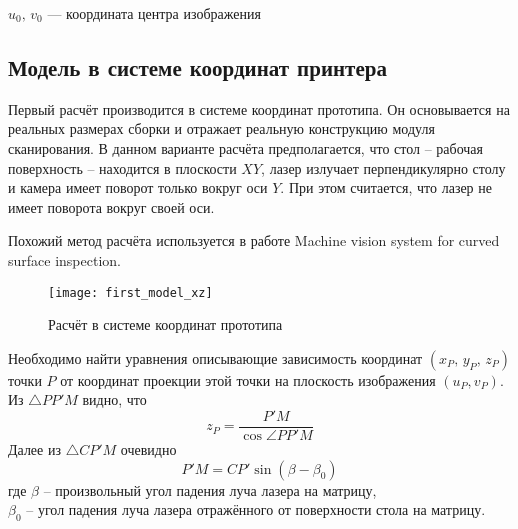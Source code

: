             $ u_0,\,v_0 $ --- координата центра изображения
            
        \subsection{Модель в системе координат принтера}
            Первый расчёт производится в системе координат прототипа. Он основывается на реальных размерах сборки и отражает реальную конструкцию модуля сканирования. В данном варианте расчёта предполагается, что стол -- рабочая поверхность -- находится в плоскости $ XY $, лазер излучает перпендикулярно столу и камера имеет поворот только вокруг оси $ Y $. При этом считается, что лазер не имеет поворота вокруг своей оси.

            Похожий метод расчёта используется в работе Machine vision system for curved surface inspection\cite{Lee2000}.

            \begin{figure}[!ht]\label{pic:first_model}
                \centering
                \texttt{[image: first\_model\_xz]}
                \caption{Расчёт в системе координат прототипа}
            \end{figure}
            
            \sloppy Необходимо найти уравнения описывающие зависимость координат $ \left(x_P,\,y_P,\,z_P\right) $ точки $ P $ от координат проекции этой точки на плоскость изображения $ \left(u_P, v_P\right) $. Из $ \triangle PP'M $ видно, что
            \begin{equation}
                z_P = \dfrac{P'M}{\cos\angle PP'M}
            \end{equation}
            Далее из $ \triangle CP'M $ очевидно
            \begin{equation}
                P'M = CP'\sin\left(\beta - \beta_0\right)
            \end{equation}
            где $ \beta $ -- произвольный угол падения луча лазера на матрицу,\\
            $\beta_0$ -- угол падения луча лазера отражённого от поверхности стола на матрицу.
            
